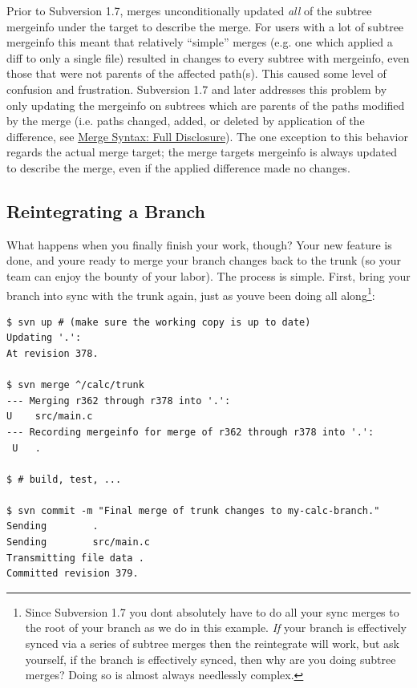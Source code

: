 Prior to Subversion 1.7, merges unconditionally updated \emph{all} of
the subtree mergeinfo under the target to describe the merge. For users
with a lot of subtree mergeinfo this meant that relatively ``simple''
merges (e.g. one which applied a diff to only a single file) resulted in
changes to every subtree with mergeinfo, even those that were not
parents of the affected path(s). This caused some level of confusion and
frustration. Subversion 1.7 and later addresses this problem by only
updating the mergeinfo on subtrees which are parents of the paths
modified by the merge (i.e. paths changed, added, or deleted by
application of the difference, see
\hyperref[svn.branchmerge.advanced.advancedsyntax]{Merge Syntax: Full
Disclosure}). The one exception to this behavior regards the actual
merge target; the merge target\textquotesingle s mergeinfo is always
updated to describe the merge, even if the applied difference made no
changes.

\subsection{Reintegrating a
Branch}\label{svn.branchmerge.basicmerging.reintegrate}

What happens when you finally finish your work, though? Your new feature
is done, and you\textquotesingle re ready to merge your branch changes
back to the trunk (so your team can enjoy the bounty of your labor). The
process is simple. First, bring your branch into sync with the trunk
again, just as you\textquotesingle ve been doing all along\footnote{Since
  Subversion 1.7 you don\textquotesingle t absolutely have to do all
  your sync merges to the root of your branch as we do in this example.
  \emph{If} your branch is effectively synced via a series of subtree
  merges then the reintegrate will work, but ask yourself, if the branch
  is effectively synced, then why are you doing subtree merges? Doing so
  is almost always needlessly complex.}:

\begin{verbatim}
$ svn up # (make sure the working copy is up to date)
Updating '.':
At revision 378.

$ svn merge ^/calc/trunk
--- Merging r362 through r378 into '.':
U    src/main.c
--- Recording mergeinfo for merge of r362 through r378 into '.':
 U   .

$ # build, test, ...

$ svn commit -m "Final merge of trunk changes to my-calc-branch."
Sending        .
Sending        src/main.c
Transmitting file data .
Committed revision 379.
\end{verbatim}

